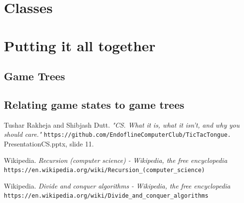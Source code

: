 \documentclass{article}
\begin{document}
\section{Classes}

\section{Putting it all together}

\subsection{Game Trees}

\subsection{Relating game states to game trees}

\begin{thebibliography}{9}
 {
Tushar Rakheja and Shibjash Dutt.
\textit{"CS. What it is, what it isn't, and why you should care."}
\texttt{https://github.com/EndoflineComputerClub/TicTacTongue.}
\\PresentationCS.pptx, slide 11. }

Wikipedia.
\textit{Recursion (computer science) - Wikipedia, the free encyclopedia}
\texttt{https://en.wikipedia.org/wiki/Recursion\_(computer\_science)}

Wikipedia.
\textit{Divide and conquer algorithms - Wikipedia, the free encyclopedia}
\texttt{https://en.wikipedia.org/wiki/Divide\_and\_conquer\_algorithms}
\end{thebibliography}
\end{document}
